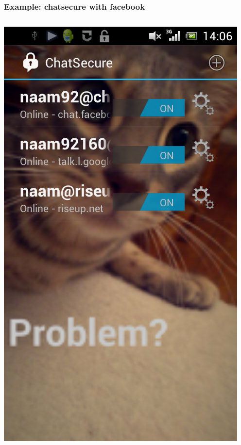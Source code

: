 \begin{frame}
\frametitle{Example:  chatsecure with facebook}
\begin{columns}[c]
    \includegraphics[height=.9\textheight]{./materials/chat_secure_account}

\end{columns}
\end{frame}
